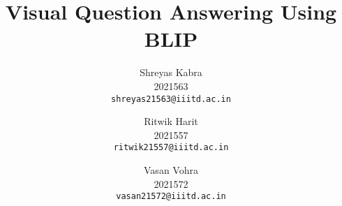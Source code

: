\documentclass[10pt,twocolumn,letterpaper]{article}
\title{Visual Question Answering Using BLIP}
\author{
Shreyas Kabra\\
2021563\\
{\tt\small shreyas21563@iiitd.ac.in}
\and
Ritwik Harit\\
2021557\\
{\tt\small ritwik21557@iiitd.ac.in}
\and
Vasan Vohra\\
2021572\\
{\tt\small vasan21572@iiitd.ac.in}
}
\begin{document}
\maketitle
    








{
    \small
    
    
}

% 
\end{document}
